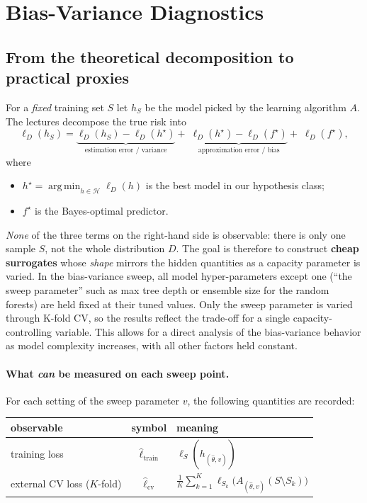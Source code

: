 \documentclass[12pt]{report}
\begin{document}
\section{Bias-Variance Diagnostics}

\subsection{From the theoretical decomposition to practical proxies}

For a \emph{fixed} training set $S$ let $h_S$ be the model picked by the learning
algorithm $A$.  The lectures decompose the true risk into
\[
  \ell_D(h_S)=
  \underbrace{\ell_D(h_S)-\ell_D(h^\star)}_{\text{estimation error / variance}}
  +\;\underbrace{\ell_D(h^\star)-\ell_D(f^\star)}_{\text{approximation error / bias}}
  +\;\ell_D(f^\star),
\]
where
\begin{itemize}
  \item $h^\star=
        \operatorname*{arg\,min}_{h\in\mathcal H}\ell_D(h)$ is the best model
        in our hypothesis class;
  \item $f^\star$ is the Bayes-optimal predictor.
\end{itemize}

\emph{None} of the three terms on the right-hand side is observable: there is only one 
sample $S$, not the whole distribution $D$. The goal is therefore to construct 
\textbf{cheap surrogates} whose \emph{shape} mirrors the hidden quantities as a capacity 
parameter is varied.
In the bias-variance sweep, all model hyper-parameters except one 
(“the sweep parameter” such as max tree depth or ensemble size for the random forests) 
are held fixed at their tuned values. Only the sweep parameter is varied through 
K-fold CV, so the results reflect the trade-off for a single capacity-controlling 
variable. This allows for a direct analysis of the bias-variance behavior as model 
complexity increases, with all other factors held constant.

\paragraph{What \emph{can} be measured on each sweep point.}

For each setting of the sweep parameter $v$, the following quantities are recorded:
\begin{center}
\begin{tabular}{lcl}
  \toprule
  observable & symbol & meaning \\ \midrule
  training loss & $\widehat \ell_{\text{train}}$
    & $\ell_S(h_{(\hat\theta, v)})$ \\[4pt]
  external CV loss ($K$-fold)
    & $\widehat \ell_{\text{cv}}$
    & $\displaystyle
      \frac{1}{K} \sum_{k=1}^{K}
      \ell_{S_k}\bigl(A_{(\hat\theta, v)}(S \setminus S_k)\bigr)$ \\ \bottomrule
\end{tabular}
\end{center}
\end{document}
